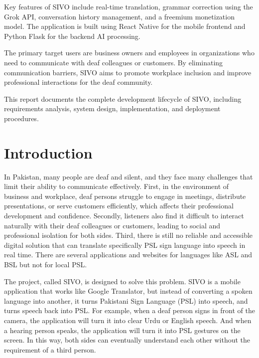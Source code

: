 \documentclass[12pt,a4paper,oneside]{report}
\begin{document}
Key features of SIVO include real-time translation, grammar correction using the Grok API, conversation history management, and a freemium monetization model. The application is built using React Native for the mobile frontend and Python Flask for the backend AI processing.

The primary target users are business owners and employees in organizations who need to communicate with deaf colleagues or customers. By eliminating communication barriers, SIVO aims to promote workplace inclusion and improve professional interactions for the deaf community.

This report documents the complete development lifecycle of SIVO, including requirements analysis, system design, implementation, and deployment procedures.

\newpage
\tableofcontents

\newpage
{}
\listoffigures

\listoftables

\newpage
{}
\setcounter{page}{1}
\pagestyle{fancy}

\chapter{Introduction}

In Pakistan, many people are deaf and silent, and they face many challenges that limit their ability to communicate effectively. First, in the environment of business and workplace, deaf persons struggle to engage in meetings, distribute presentations, or serve customers efficiently, which affects their professional development and confidence. Secondly, listeners also find it difficult to interact naturally with their deaf colleagues or customers, leading to social and professional isolation for both sides. Third, there is still no reliable and accessible digital solution that can translate specifically PSL sign language into speech in real time. There are several applications and websites for languages like ASL and BSL but not for local PSL.

The project, called SIVO, is designed to solve this problem. SIVO is a mobile application that works like Google Translator, but instead of converting a spoken language into another, it turns Pakistani Sign Language (PSL) into speech, and turns speech back into PSL. For example, when a deaf person signs in front of the camera, the application will turn it into clear Urdu or English speech. And when a hearing person speaks, the application will turn it into PSL gestures on the screen. In this way, both sides can eventually understand each other without the requirement of a third person.
\end{document}
